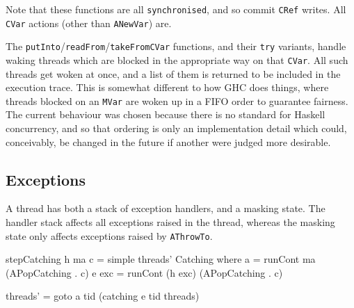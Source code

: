 Note that these functions are all \verb|synchronised|, and so commit
\verb|CRef| writes. All \verb|CVar| actions (other than
\verb|ANewVar|) are.


The \verb|putInto|/\verb|readFrom|/\verb|takeFromCVar| functions, and
their \verb|try| variants, handle waking threads which are blocked in
the appropriate way on that \verb|CVar|. All such threads get woken at
once, and a list of them is returned to be included in the execution
trace. This is somewhat different to how GHC does things, where
threads blocked on an \verb|MVar| are woken up in a FIFO order to
guarantee fairness. The current behaviour was chosen because there is
no standard for Haskell concurrency, and so that ordering is only an
implementation detail which could, conceivably, be changed in the
future if another were judged more desirable.

\subsection{Exceptions}
\label{sec:execution-stepwise-exception}

A thread has both a stack of exception handlers, and a masking
state. The handler stack affects all exceptions raised in the thread,
whereas the masking state only affects exceptions raised by
\verb|AThrowTo|.

\begin{haskellcode}
stepCatching h ma c = simple threads' Catching where
  a     = runCont ma      (APopCatching . c)
  e exc = runCont (h exc) (APopCatching . c)

  threads' = goto a tid (catching e tid threads)
\end{haskellcode}

